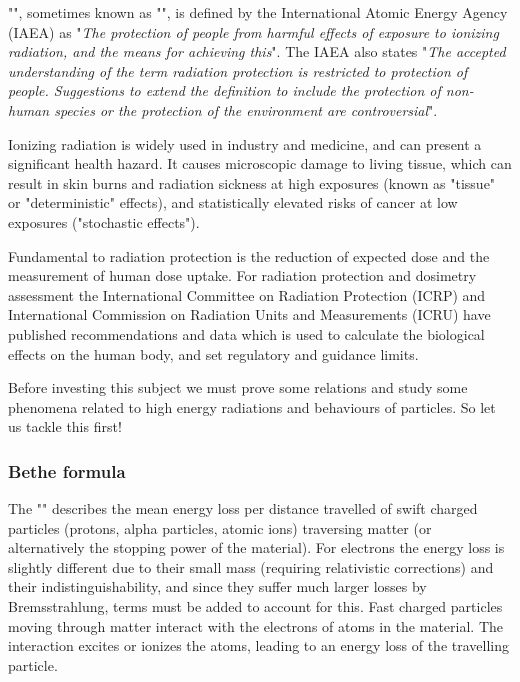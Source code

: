 	"", sometimes known as "", is defined by the International Atomic Energy Agency (IAEA) as "\textit{The protection of people from harmful effects of exposure to ionizing radiation, and the means for achieving this}". The IAEA also states "\textit{The accepted understanding of the term radiation protection is restricted to protection of people. Suggestions to extend the definition to include the protection of non-human species or the protection of the environment are controversial}".

	Ionizing radiation is widely used in industry and medicine, and can present a significant health hazard. It causes microscopic damage to living tissue, which can result in skin burns and radiation sickness at high exposures (known as "tissue" or "deterministic" effects), and statistically elevated risks of cancer at low exposures ("stochastic effects").

	Fundamental to radiation protection is the reduction of expected dose and the measurement of human dose uptake. For radiation protection and dosimetry assessment the International Committee on Radiation Protection (ICRP) and International Commission on Radiation Units and Measurements (ICRU) have published recommendations and data which is used to calculate the biological effects on the human body, and set regulatory and guidance limits.

	Before investing this subject we must prove some relations and study some phenomena related to high energy radiations and behaviours of particles. So let us tackle this first!

	\subsubsection{Bethe formula}\label{bethe formula}
	The "" describes the mean energy loss per distance travelled of swift charged particles (protons, alpha particles, atomic ions) traversing matter (or alternatively the stopping power of the material). For electrons the energy loss is slightly different due to their small mass (requiring relativistic corrections) and their indistinguishability, and since they suffer much larger losses by Bremsstrahlung, terms must be added to account for this. Fast charged particles moving through matter interact with the electrons of atoms in the material. The interaction excites or ionizes the atoms, leading to an energy loss of the travelling particle.
	
